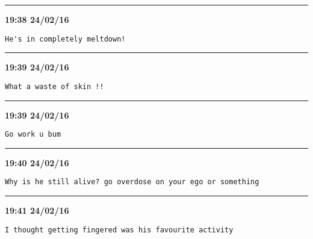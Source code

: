 \hrule%

\begin{adjustwidth}{0cm}{0cm}
\footnotesize \textbf{19:38 24/02/16}

\begin{lstlisting}[breaklines, breakatwhitespace, basicstyle=\small, frame=leftline]
He's in completely meltdown!
\end{lstlisting}
\end{adjustwidth}

\hrule%

\begin{adjustwidth}{0cm}{0cm}
\footnotesize \textbf{19:39 24/02/16}

\begin{lstlisting}[breaklines, breakatwhitespace, basicstyle=\small, frame=leftline]
What a waste of skin !!
\end{lstlisting}
\end{adjustwidth}

\hrule%

\begin{adjustwidth}{0cm}{0cm}
\footnotesize \textbf{19:39 24/02/16}

\begin{lstlisting}[breaklines, breakatwhitespace, basicstyle=\small, frame=leftline]
Go work u bum
\end{lstlisting}
\end{adjustwidth}

\hrule%

\begin{adjustwidth}{0cm}{0cm}
\footnotesize \textbf{19:40 24/02/16}

\begin{lstlisting}[breaklines, breakatwhitespace, basicstyle=\small, frame=leftline]
Why is he still alive? go overdose on your ego or something
\end{lstlisting}
\end{adjustwidth}

\hrule%

\begin{adjustwidth}{0cm}{0cm}
\footnotesize \textbf{19:41 24/02/16}

\begin{lstlisting}[breaklines, breakatwhitespace, basicstyle=\small, frame=leftline]
I thought getting fingered was his favourite activity
\end{lstlisting}
\end{adjustwidth}

